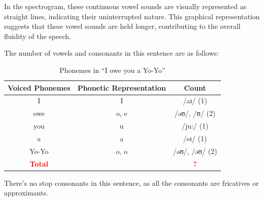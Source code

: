 In the spectrogram, these continuous vowel sounds are visually represented as straight lines, indicating their uninterrupted nature. This graphical representation suggests that these vowel sounds are held longer, contributing to the overall fluidity of the speech.

The number of vowels and consonants in this sentence are as follows:

\begin{table}[H]
    \centering
    \begin{tabular}{|c|c|c|}
        \hline
        \textbf{Voiced Phonemes} & \textbf{Phonetic Representation} & \textbf{Count} \\ \hline
        I  & I & /aɪ/ (1) \\ \hline
        owe & o, e & /əʊ/, /ʊ/ (2) \\ \hline
        you & u & /ju:/ (1) \\ \hline
        a & a & /eɪ/ (1) \\ \hline
        Yo-Yo & o, o & /əʊ/, /əʊ/ (2) \\ \hline
        \textcolor{red}{\textbf{Total}} & & \textcolor{red}{7} \\ \hline
    \end{tabular}
    \caption{Phonemes in ``I owe you a Yo-Yo''}
\end{table}

There's no stop consonants in this sentence, as all the consonants are fricatives or approximants.

\newpage